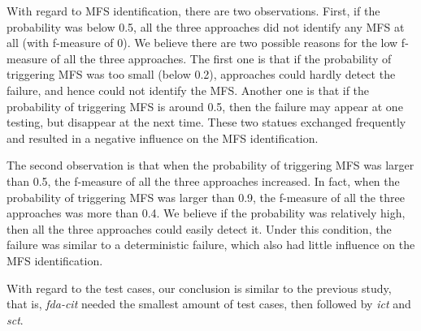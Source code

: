 \documentclass[journal,12pt,onecolumn,draftclsnofoot,]{IEEEtran}
\begin{document}
With regard to MFS identification, there are two observations. First, if the probability was below 0.5, all the three approaches did  not identify any MFS at all (with f-measure of 0). We believe there are two possible reasons for the low f-measure of all the three approaches. The first one is that if the probability of triggering MFS was too small (below 0.2), approaches could hardly detect the failure, and hence could not identify the MFS. Another one is that if the probability of triggering MFS is around 0.5, then the failure may appear at one testing, but disappear at the next time. These two statues exchanged frequently and resulted in a negative influence on the MFS identification.


The second observation is that when the probability of triggering MFS was larger than 0.5, the f-measure of all the three approaches increased. In fact, when the probability of triggering MFS was larger than 0.9,  the f-measure of all the three approaches was more than 0.4. We believe if the probability was relatively high, then all the three approaches could easily detect it. Under this condition, the failure was similar to a deterministic failure, which also had little influence on the MFS identification.


With regard to the test cases, our conclusion is similar to the previous study, that is, \emph{fda-cit} needed the smallest amount of test cases, then followed by \emph{ict} and \emph{sct}.
\end{document}
